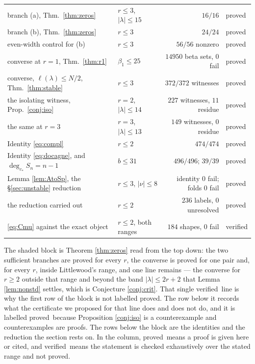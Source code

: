 \documentclass[11pt,reqno]{amsart}
\newcommand{\stproved}{\textcolor{hproved}{\small proved}}
\newcommand{\stverif}{\textcolor{hverif}{\small verified}}
\theoremstyle{plain}
\theoremstyle{definition}
\begin{document}
\begin{center}
\begin{tabular}{llrl}
\rowcolor{hband} \quad branch (a), Thm.~\ref{thm:zeros} & $r\le3$, $|\lambda|\le15$ &
$16/16$ & \stproved\\
\rowcolor{hband} \quad branch (b), Thm.~\ref{thm:zeros} & $r\le3$ & $24/24$ & \stproved\\
\rowcolor{hband} \quad even-width control for (b) & $r\le3$ & $56/56$ nonzero & \stproved\\
\rowcolor{hband} \quad converse at $r=1$, Thm.~\ref{thm:r1} & $\beta_1\le25$ &
$14950$ beta sets, $0$ fail & \stproved\\
\rowcolor{hband} \quad converse, $\ell(\lambda)\le N/2$, Thm.~\ref{thm:stable} & $r\le3$ &
$372/372$ witnesses & \stproved\\
\rowcolor{hband} \quad the isolating witness, Prop.~\ref{conj:iso} & $r=2$, $|\lambda|\le14$ &
$227$ witnesses, $11$ residue & \stproved\\
\rowcolor{hband} \quad the same at $r=3$ & $r=3$, $|\lambda|\le13$ &
$149$ witnesses, $0$ residue & \stproved\\
\midrule
Identity \eqref{eq:compl} & $r\le2$ & $474/474$ & \stproved\\
Identity \eqref{eq:docagne}, and $\deg_{c_\ast}S_n=n-1$ & $b\le31$ & $496/496$; $39/39$ &
\stproved\\
Lemma \ref{lem:AtoSp}, the \S\ref{sec:unstable} reduction & $r\le3$, $|\nu|\le8$ &
identity $0$ fail; folds $0$ fail & \stproved\\
\quad the reduction carried out & $r\le2$ & $236$ labels, $0$ unresolved & \stproved\\
\eqref{eq:Cmu} against the exact object & $r\le2$, both ranges & $184$ shapes, $0$ fail &
\stverif\\
\bottomrule
\end{tabular}
\end{center}

\noindent The shaded block is Theorem \ref{thm:zeros} read from the top down: the two sufficient
branches are proved for every $r$, the converse is proved for one pair and, for every $r$, inside
Littlewood's range, and one line remains --- the converse for $r\ge2$ outside that range and beyond
the band $|\lambda|\le2r+2$ that Lemma \ref{lem:nonstd} settles, which is Conjecture
\ref{conj:crit}. That single \stverif\ line is why the first row of the block is not
labelled \stproved. The row below it records what the certificate we proposed for that line does and
does not do, and it is labelled \stproved\ because Proposition \ref{conj:iso} is a counterexample and
counterexamples are proofs. The rows below the block are the identities and the reduction the section rests
on. In the column, \stproved\ means a proof is given here or cited, and \stverif\ means the
statement is checked exhaustively over the stated range and not proved.
\end{document}
